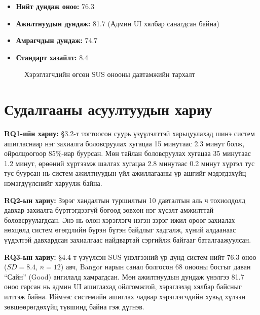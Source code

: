 \begin{itemize}
    \item \textbf{Нийт дундаж оноо:} 76.3
    \item \textbf{Ажилтнуудын дундаж:} 81.7 (Админ UI хялбар санагдсан байна)
    \item \textbf{Амрагчдын дундаж:} 74.7
    \item \textbf{Стандарт хазайлт:} 8.4
\end{itemize}

\begin{figure}[H]
  \centering
  \caption{Хэрэглэгчдийн өгсөн SUS онооны давтамжийн тархалт}
  \label{fig:sus-histogram}
\end{figure}

\section{Судалгааны асуултуудын хариу}

\textbf{RQ1-ийн хариу:} §3.2-т тогтоосон суурь үзүүлэлттэй харьцуулахад шинэ систем ашигласнаар нэг захиалга боловсруулах хугацаа 15 минутаас 2.3 минут болж, ойролцоогоор 85\%-иар буурсан. Мөн тайлан боловсруулах хугацаа 35 минутаас 1.2 минут, өрөөний хүртээмж шалгах хугацаа 2.8 минутаас 0.2 минут хүртэл тус тус буурсан нь систем ажилтнуудын үйл ажиллагааны үр ашгийг мэдэгдэхүйц нэмэгдүүлснийг харуулж байна.

\textbf{RQ2-ын хариу:} Зэрэг хандалтын туршилтын 10 давталтын аль ч тохиолдолд давхар захиалга бүртгэгдээгүй бөгөөд зөвхөн нэг хүсэлт амжилттай боловсруулагдсан. Энэ нь олон хэрэглэгч нэгэн зэрэг ижил өрөөг захиалах нөхцөлд систем өгөгдлийн бүрэн бүтэн байдлыг хадгалж, хүний алдаанаас үүдэлтэй давхардсан захиалгаас найдвартай сэргийлж байгааг баталгаажуулсан.

\textbf{RQ3-ын хариу:} §4.4-т үзүүлсэн SUS үнэлгээний үр дүнд систем нийт 76.3 оноо ($SD=8.4$, $n=12$) авч, Bangor нарын санал болгосон 68 онооны босгыг даван ``Сайн'' (Good) ангилалд хамрагдсан\cite{bangor2008sus}. Мөн ажилтнуудын дундаж үнэлгээ 81.7 оноо гарсан нь админ UI ашиглахад ойлгомжтой, хэрэглэхэд хялбар байсныг илтгэж байна. Иймээс системийн ашиглах чадвар хэрэглэгчдийн хувьд хүлээн зөвшөөрөгдөхүйц түвшинд байна гэж дүгнэв.

